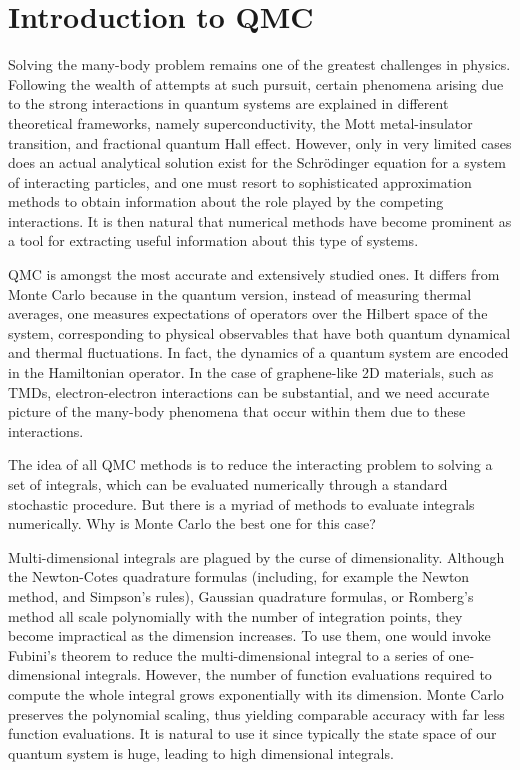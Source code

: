 \section{Introduction to \acl{QMC}}
\label{sec:introQMC}

Solving the many-body problem remains one of the greatest challenges in physics.
Following the wealth of attempts at such pursuit, certain phenomena arising due to the strong interactions in quantum systems are explained in different theoretical frameworks, namely superconductivity, the Mott metal-insulator transition, and fractional quantum Hall effect.
However, only in very limited cases does an actual analytical solution exist for the  Schr\"odinger equation for a system of interacting particles, and one must resort to sophisticated approximation methods to obtain information about the role played by the competing interactions.
It is then natural that numerical methods have become prominent as a tool for extracting useful information about this type of systems.

\acl{QMC} is amongst the most accurate and extensively studied ones.
It differs from  Monte Carlo because in the quantum version, instead of measuring thermal averages, one measures expectations of operators over the Hilbert space of the system, corresponding to physical observables that have both quantum dynamical and thermal fluctuations.
In fact, the dynamics of a quantum system are encoded in the Hamiltonian operator.
In the case of graphene-like \ac{2D} materials, such as \acp{TMD}, electron-electron interactions can be substantial, and we need accurate picture of the many-body phenomena that occur within them due to these interactions.

The idea of all \ac{QMC} methods is to reduce the interacting problem to solving a set of integrals, which can be evaluated numerically through a standard stochastic procedure.
But there is a myriad of methods to evaluate integrals numerically.
Why is Monte Carlo the best one for this case?

Multi-dimensional integrals are plagued by the curse of dimensionality.
Although the Newton-Cotes quadrature formulas (including, for example the Newton method, and Simpson's rules), Gaussian quadrature formulas, or Romberg's method all scale polynomially with the number of integration points, they become impractical as the dimension increases.
To use them, one would invoke Fubini's theorem to reduce the multi-dimensional integral to a series of one-dimensional integrals.
However, the number of function evaluations required to compute the whole integral grows exponentially with its dimension.
Monte Carlo preserves the polynomial scaling, thus yielding comparable accuracy with far less function evaluations.
It is natural to use it since typically the state space of our quantum system is huge, leading to high dimensional integrals.

